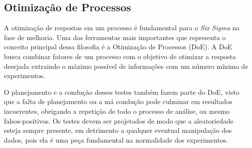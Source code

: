 \subsection{Otimização de Processos}

A otimização de respostas em um processo é fundamental para o \textit{Six Sigma} na fase de melhoria. Uma das ferramentas mais importantes que representa o conceito principal dessa filosofia é a Otimização de Processos (DoE). A DoE busca combinar fatores de um processo com o objetivo de otimizar a resposta desejada extraindo o máximo possível de informações com um número mínimo de experimentos. \cite{abepro}

O planejamento e a condução desses testes também fazem parte do DoE, visto que a falta de planejamento ou a má condução pode culminar em resultados incoerentes, obrigando a repetição de todo o processo de análise, ou mesmo falsos-positivos. Os testes devem ser projetados de modo que a aleatoriedade esteja sempre presente, em detrimento a qualquer eventual manipulação dos dados, pois ela é uma peça fundamental na normalidade dos experimentos.